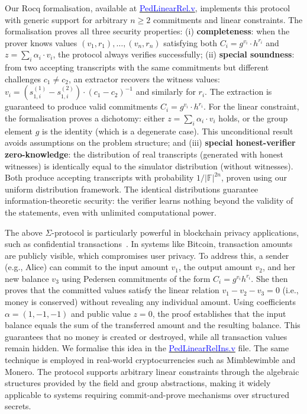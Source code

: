 \documentclass[sigconf, anonymous]{acmart}
\begin{document}
Our Rocq formalisation, available at \href{https://anonymous.4open.science/r/SigmaProtocol-EBA5/src/Crypto/PedLinearRel.v}{\textcolor{blue}{PedLinearRel.v}}, implements this protocol with generic support for arbitrary $n \geq 2$ commitments and linear constraints. The formalisation proves all three security properties: (i) \textbf{completeness}: when the prover knows values $(v_1, r_1), \ldots, (v_n, r_n)$ satisfying both $C_i = g^{v_i} \cdot h^{r_i}$ and $z = \sum_i \alpha_i \cdot v_i$, the protocol always verifies successfully; (ii) \textbf{special soundness}: from two accepting transcripts with the same commitments but different challenges $c_1 \neq c_2$, 
an extractor recovers the witness values: $v_i = (s_{1,i}^{(1)} - s_{1,i}^{(2)}) \cdot (c_1 - c_2)^{-1}$ 
and similarly for $r_i$. The extraction is guaranteed to produce valid commitments $C_i = g^{v_i} \cdot h^{r_i}$. 
For the linear constraint, the formalisation proves a dichotomy: either $z = \sum_i \alpha_i \cdot v_i$ holds, 
or the group element $g$ is the identity (which is a degenerate case). This unconditional result avoids 
assumptions on the problem structure; and (iii) \textbf{special honest-verifier zero-knowledge}: 
the distribution of real transcripts (generated with honest witnesses) is identically equal to the 
simulator distribution (without witnesses). Both produce accepting transcripts with probability 
$1/|\mathbb{F}|^{2n}$, proven using our uniform distribution framework. The identical distributions 
guarantee information-theoretic security: the verifier learns nothing beyond the validity of the 
statements, even with unlimited computational power.

The above $\Sigma$-protocol is particularly powerful in blockchain privacy applications, such as confidential transactions~\cite{10.1007/978-3-030-17653-2_22}. In systems like Bitcoin, transaction amounts are publicly visible, which compromises user privacy. To address this, a sender (e.g., Alice) can commit to the input amount $v_1$, the output amount $v_2$, and her new balance $v_3$ using Pedersen commitments of the form $C_i = g^{v_i} h^{r_i}$. She then proves that the committed values satisfy the linear relation $v_1 - v_2 - v_3 = 0$ (i.e., money is conserved) without revealing any individual amount. Using coefficients $\alpha = (1, -1, -1)$ and public value $z = 0$, the proof establishes that the input balance equals the sum of the transferred amount and the resulting balance. This guarantees that no money is created or destroyed, while all transaction values remain hidden. We formalise this idea in the \href{https://anonymous.4open.science/r/SigmaProtocol-EBA5/src/Examples/PedLinearRelIns.v}{\textcolor{blue}{PedLinearRelIns.v}} file. The same technique is employed in real-world cryptocurrencies such as Mimblewimble and Monero. The protocol supports arbitrary linear constraints through the algebraic structures provided by the field and group abstractions, making it widely applicable to systems requiring commit-and-prove mechanisms over structured secrets.
\end{document}
